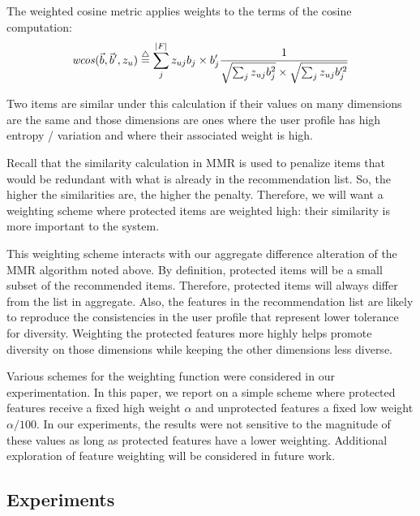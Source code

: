 The weighted cosine metric applies weights to the terms of the cosine computation:
\begin{equation}
    \mathit{wcos}(\vec{b}, \vec{b}', z_u)\buildrel\triangle\over= \sum_{j}^{|F|}{z_{uj} b_j \times b'_j} \frac{1} {\sqrt{\sum_{j} {z_{uj} b^2_j}} \times \sqrt{\sum_{j}{z_{uj} 
    b'^2_j}}}
\end{equation}

Two items are similar under this calculation if their values on many dimensions are the same and those dimensions are ones where the user profile has high entropy / variation and where their associated weight is high. 

Recall that the similarity calculation in MMR is used to penalize items that would be redundant with what is already in the recommendation list. So, the higher the similarities are, the higher the penalty. Therefore, we will want a weighting scheme where protected items are weighted high: their similarity is more important to the system.

This weighting scheme interacts with our aggregate difference alteration of the MMR algorithm noted above. By definition, protected items will be a small subset of the recommended items. Therefore, protected items will always differ from the list in aggregate. Also, the features in the recommendation list are likely to reproduce the consistencies in the user profile that represent lower tolerance for diversity. Weighting the protected features more highly helps promote diversity on those dimensions while keeping the other dimensions less diverse.

Various schemes for the weighting function were considered in our experimentation. In this paper, we report on a simple scheme where protected features receive a fixed high weight $\alpha$ and unprotected features a fixed low weight $\alpha/100$. In our experiments, the results were not sensitive to the magnitude of these values as long as protected features have a lower weighting. Additional exploration of feature weighting will be considered in future work. 


\subsection{Experiments}\label{subsect:ofair_expp}
\label{subsec:ofair_experiemtns}

